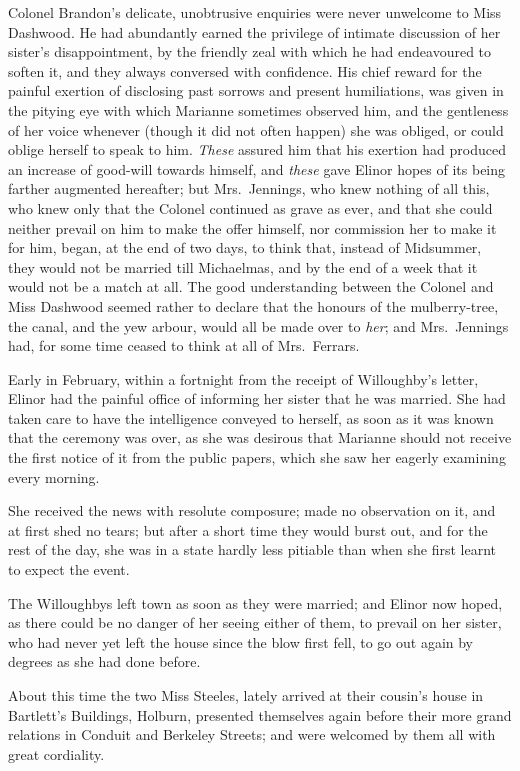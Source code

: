 Colonel Brandon's delicate, unobtrusive enquiries
were never unwelcome to Miss Dashwood.  He had abundantly
earned the privilege of intimate discussion of her
sister's disappointment, by the friendly zeal with
which he had endeavoured to soften it, and they always
conversed with confidence.  His chief reward for the
painful exertion of disclosing past sorrows and present
humiliations, was given in the pitying eye with which
Marianne sometimes observed him, and the gentleness
of her voice whenever (though it did not often happen)
she was obliged, or could oblige herself to speak to him.
\emph{These} assured him that his exertion had produced an
increase of good-will towards himself, and \emph{these} gave
Elinor hopes of its being farther augmented hereafter;
but Mrs.\ Jennings, who knew nothing of all this, who knew
only that the Colonel continued as grave as ever, and that
she could neither prevail on him to make the offer himself,
nor commission her to make it for him, began, at the
end of two days, to think that, instead of Midsummer,
they would not be married till Michaelmas, and by the
end of a week that it would not be a match at all.
The good understanding between the Colonel and Miss
Dashwood seemed rather to declare that the honours
of the mulberry-tree, the canal, and the yew arbour,
would all be made over to \emph{her}; and Mrs.\ Jennings had,
for some time ceased to think at all of Mrs.\ Ferrars.

Early in February, within a fortnight from the
receipt of Willoughby's letter, Elinor had the painful
office of informing her sister that he was married.
She had taken care to have the intelligence conveyed
to herself, as soon as it was known that the ceremony
was over, as she was desirous that Marianne should not
receive the first notice of it from the public papers,
which she saw her eagerly examining every morning.

She received the news with resolute composure;
made no observation on it, and at first shed no tears;
but after a short time they would burst out, and for the
rest of the day, she was in a state hardly less pitiable
than when she first learnt to expect the event.

The Willoughbys left town as soon as they were married;
and Elinor now hoped, as there could be no danger
of her seeing either of them, to prevail on her sister,
who had never yet left the house since the blow first fell,
to go out again by degrees as she had done before.

About this time the two Miss Steeles, lately arrived
at their cousin's house in Bartlett's Buildings,
Holburn, presented themselves again before their more
grand relations in Conduit and Berkeley Streets;
and were welcomed by them all with great cordiality.

